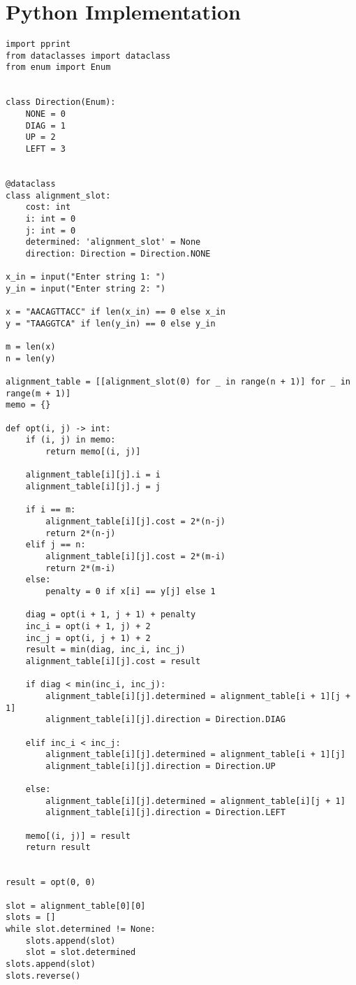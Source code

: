 \documentclass{article}
\renewcommand{\_}{\ifincsname_\else\legacyunderscore\fi}
\begin{document}
\section*{Python Implementation}
\begin{lstlisting}
import pprint
from dataclasses import dataclass
from enum import Enum


class Direction(Enum):
    NONE = 0
    DIAG = 1
    UP = 2
    LEFT = 3


@dataclass
class alignment_slot:
    cost: int
    i: int = 0
    j: int = 0
    determined: 'alignment_slot' = None
    direction: Direction = Direction.NONE
    
x_in = input("Enter string 1: ")
y_in = input("Enter string 2: ")

x = "AACAGTTACC" if len(x_in) == 0 else x_in
y = "TAAGGTCA" if len(y_in) == 0 else y_in

m = len(x)
n = len(y)

alignment_table = [[alignment_slot(0) for _ in range(n + 1)] for _ in range(m + 1)]
memo = {}

def opt(i, j) -> int:
    if (i, j) in memo:
        return memo[(i, j)]

    alignment_table[i][j].i = i
    alignment_table[i][j].j = j
    
    if i == m:
        alignment_table[i][j].cost = 2*(n-j)
        return 2*(n-j)
    elif j == n:
        alignment_table[i][j].cost = 2*(m-i)
        return 2*(m-i)
    else:
        penalty = 0 if x[i] == y[j] else 1

    diag = opt(i + 1, j + 1) + penalty
    inc_i = opt(i + 1, j) + 2
    inc_j = opt(i, j + 1) + 2
    result = min(diag, inc_i, inc_j)
    alignment_table[i][j].cost = result

    if diag < min(inc_i, inc_j):
        alignment_table[i][j].determined = alignment_table[i + 1][j + 1]
        alignment_table[i][j].direction = Direction.DIAG
        
    elif inc_i < inc_j:
        alignment_table[i][j].determined = alignment_table[i + 1][j]
        alignment_table[i][j].direction = Direction.UP
        
    else:
        alignment_table[i][j].determined = alignment_table[i][j + 1]
        alignment_table[i][j].direction = Direction.LEFT
    
    memo[(i, j)] = result
    return result


result = opt(0, 0)

slot = alignment_table[0][0]
slots = []
while slot.determined != None:
    slots.append(slot)
    slot = slot.determined
slots.append(slot)
slots.reverse()


\end{lstlisting}
\end{document}
